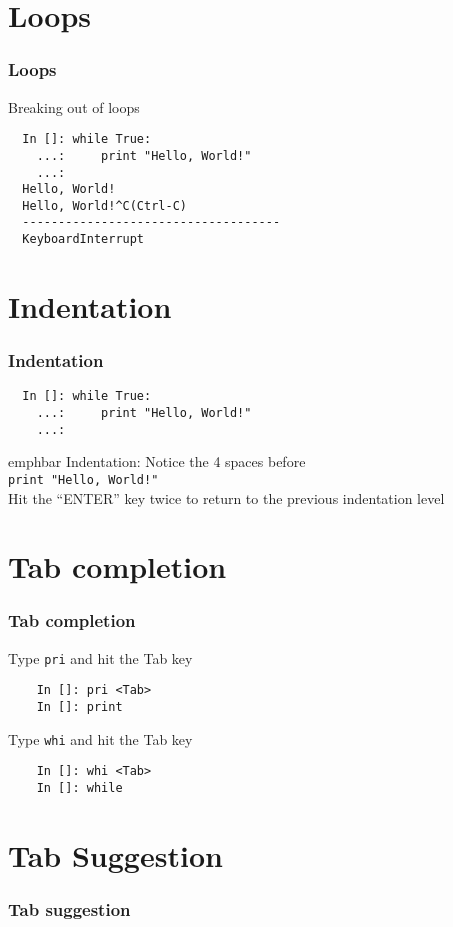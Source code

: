 \documentclass[14pt,compress]{beamer}
\newcommand{\emphbar}[1]
{\begin{beamercolorbox}[rounded=true]{emphbar} 
      {#1}
 \end{beamercolorbox}
}
\newcommand{\typ}[1]{\lstinline{#1}}
\begin{document}
\section{Loops}
\begin{frame}[fragile]
\frametitle{Loops}
Breaking out of loops
\begin{lstlisting}     
  In []: while True:
    ...:     print "Hello, World!"
    ...:     
  Hello, World!
  Hello, World!^C(Ctrl-C)
  ------------------------------------
  KeyboardInterrupt                   
\end{lstlisting}
\end{frame}

\section{Indentation}
\begin{frame}[fragile]
  \frametitle{Indentation}
  \begin{lstlisting}
  In []: while True:
    ...:     print "Hello, World!"
    ...:     
  \end{lstlisting}
\emphbar{\alert{Indentation: Notice the 4 spaces before\\} \typ{print "Hello, World!"}\\
  Hit the ``ENTER'' key twice to return to the previous indentation level}
\end{frame}

\section{Tab completion}
\begin{frame}[fragile]
  \frametitle{Tab completion}
  Type \typ{pri} and hit the Tab key
  \begin{lstlisting}
    In []: pri <Tab>
    In []: print
  \end{lstlisting}
  Type \typ{whi} and hit the Tab key
  \begin{lstlisting}
    In []: whi <Tab>
    In []: while
  \end{lstlisting}
\end{frame}

\section{Tab Suggestion}
\begin{frame}[fragile]
  \frametitle{Tab suggestion}
  
\end{frame}
\end{document}
